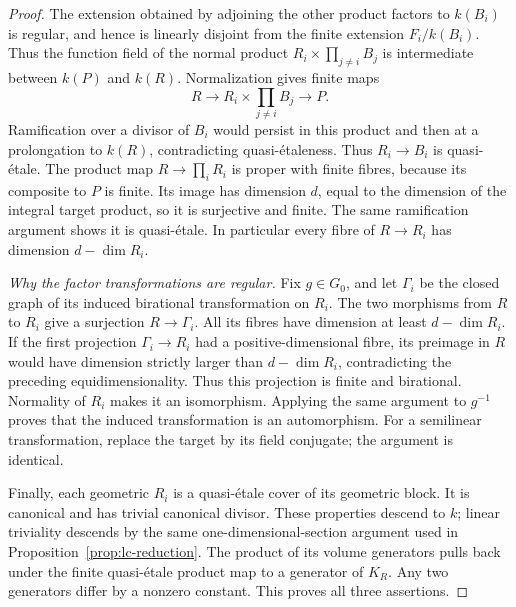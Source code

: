 \begin{proof}
The extension obtained by adjoining the other product factors
to $k(B_i)$ is regular, and hence is linearly disjoint from the
finite extension $F_i/k(B_i)$. Thus the function field of the
normal product $R_i\times\prod_{j\ne i}B_j$ is intermediate
between $k(P)$ and $k(R)$. Normalization gives finite maps
\[
          R\longrightarrow R_i\times\prod_{j\ne i}B_j
             \longrightarrow P.
\]
Ramification over a divisor of $B_i$ would persist in this
product and then at a prolongation to $k(R)$, contradicting
quasi-\'etaleness. Thus $R_i\to B_i$ is quasi-\'etale. The
product map $R\to\prod_iR_i$ is proper with finite fibres,
because its composite to $P$ is finite. Its image has dimension
$d$, equal to the dimension of the integral target product, so
it is surjective and finite. The same ramification argument
shows it is quasi-\'etale. In particular every fibre of
$R\to R_i$ has dimension $d-\dim R_i$.

\emph{Why the factor transformations are regular.}
Fix $g\in G_0$, and let $\Gamma_i$ be the closed graph of its
induced birational transformation on $R_i$. The two morphisms
from $R$ to $R_i$ give a surjection $R\to\Gamma_i$. All its
fibres have dimension at least $d-\dim R_i$. If the first
projection $\Gamma_i\to R_i$ had a positive-dimensional fibre,
its preimage in $R$ would have dimension strictly larger than
$d-\dim R_i$, contradicting the preceding equidimensionality.
Thus this projection is finite and birational. Normality of
$R_i$ makes it an isomorphism. Applying the same argument to
$g^{-1}$ proves that the induced transformation is an
automorphism. For a semilinear transformation, replace the
target by its field conjugate; the argument is identical.

Finally, each geometric $R_i$ is a quasi-\'etale cover of its
geometric block. It is canonical and has trivial canonical
divisor. These properties descend to $k$; linear triviality
descends by the same one-dimensional-section argument used in
Proposition~\ref{prop:lc-reduction}. The
product of its volume generators pulls back under the finite
quasi-\'etale product map to a generator of $K_R$. Any two
generators differ by a nonzero constant. This proves all
three assertions.
\end{proof}


